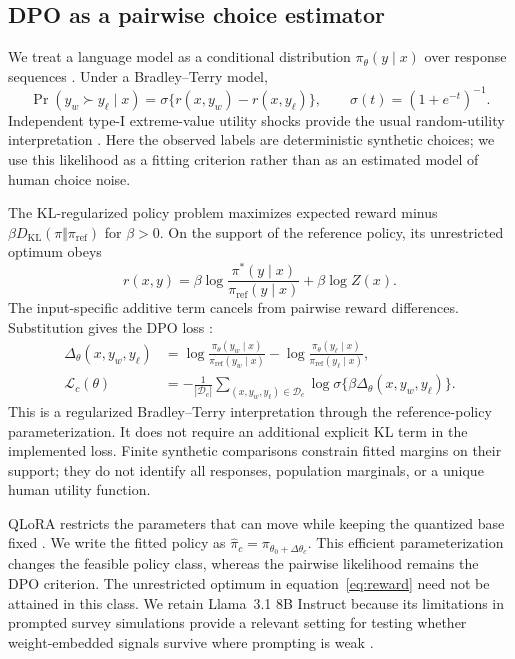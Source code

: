 \subsection{DPO as a pairwise choice estimator}
We treat a language model as a conditional distribution $\pi_\theta(y\mid x)$ over response sequences \cite{ludwig2026}. Under a Bradley--Terry model,
\begin{equation}
\Pr(y_w\succ y_\ell\mid x)=\sigma\{r(x,y_w)-r(x,y_\ell)\},\qquad \sigma(t)=(1+e^{-t})^{-1}.
\end{equation}
Independent type-I extreme-value utility shocks provide the usual random-utility interpretation \cite{bradleyterry1952}. Here the observed labels are deterministic synthetic choices; we use this likelihood as a fitting criterion rather than as an estimated model of human choice noise.

The KL-regularized policy problem maximizes expected reward minus $\beta D_{\mathrm{KL}}(\pi\Vert\pi_{\mathrm{ref}})$ for $\beta>0$. On the support of the reference policy, its unrestricted optimum obeys
\begin{equation}
r(x,y)=\beta\log\frac{\pi^*(y\mid x)}{\pi_{\mathrm{ref}}(y\mid x)}+\beta\log Z(x).
\label{eq:reward}
\end{equation}
The input-specific additive term cancels from pairwise reward differences. Substitution gives the DPO loss \cite{rafailov2023}:
\begin{align}
\Delta_\theta(x,y_w,y_\ell)&=\log\frac{\pi_\theta(y_w\mid x)}{\pi_{\mathrm{ref}}(y_w\mid x)}-\log\frac{\pi_\theta(y_\ell\mid x)}{\pi_{\mathrm{ref}}(y_\ell\mid x)},\\
\mathcal L_c(\theta)&=-\frac{1}{|\mathcal D_c|}\sum_{(x,y_w,y_\ell)\in\mathcal D_c}\log\sigma\{\beta\Delta_\theta(x,y_w,y_\ell)\}.
\label{eq:dpo}
\end{align}
This is a regularized Bradley--Terry interpretation through the reference-policy parameterization. It does not require an additional explicit KL term in the implemented loss. Finite synthetic comparisons constrain fitted margins on their support; they do not identify all responses, population marginals, or a unique human utility function.

QLoRA restricts the parameters that can move while keeping the quantized base fixed \cite{hu2022,dettmers2023}. We write the fitted policy as $\widehat\pi_c=\pi_{\theta_0+\Delta\theta_c}$. This efficient parameterization changes the feasible policy class, whereas the pairwise likelihood remains the DPO criterion. The unrestricted optimum in equation~\eqref{eq:reward} need not be attained in this class. We retain Llama~3.1 8B Instruct because its limitations in prompted survey simulations provide a relevant setting for testing whether weight-embedded signals survive where prompting is weak \cite{dalloul2026}.

